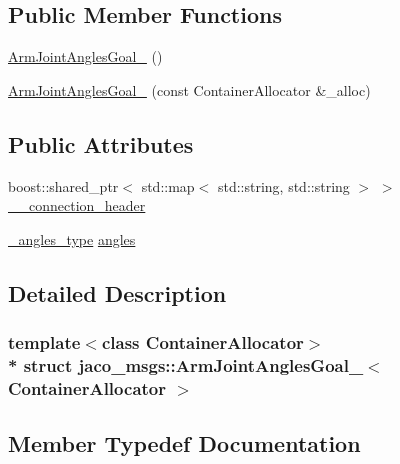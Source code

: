 \subsection*{Public Member Functions}
\begin{DoxyCompactItemize}
\item 
\hyperlink{structjaco__msgs_1_1ArmJointAnglesGoal___a7820ccc19b3f257106d5a2b372761a99}{Arm\+Joint\+Angles\+Goal\+\_\+} ()
\item 
\hyperlink{structjaco__msgs_1_1ArmJointAnglesGoal___a3ab25fae8b5ce8151a9f2e9ee6451cd2}{Arm\+Joint\+Angles\+Goal\+\_\+} (const Container\+Allocator \&\+\_\+alloc)
\end{DoxyCompactItemize}
\subsection*{Public Attributes}
\begin{DoxyCompactItemize}
\item 
boost\+::shared\+\_\+ptr$<$ std\+::map$<$ std\+::string, std\+::string $>$ $>$ \hyperlink{structjaco__msgs_1_1ArmJointAnglesGoal___a3b1fcf12b04121f8b79026bec3a97678}{\+\_\+\+\_\+connection\+\_\+header}
\item 
\hyperlink{structjaco__msgs_1_1ArmJointAnglesGoal___a426455ca4fced1b01435e33341594a89}{\+\_\+angles\+\_\+type} \hyperlink{structjaco__msgs_1_1ArmJointAnglesGoal___a21e055168ea5ac7f6ddf1746c48f315a}{angles}
\end{DoxyCompactItemize}


\subsection{Detailed Description}
\subsubsection*{template$<$class Container\+Allocator$>$\\*
struct jaco\+\_\+msgs\+::\+Arm\+Joint\+Angles\+Goal\+\_\+$<$ Container\+Allocator $>$}



\subsection{Member Typedef Documentation}

